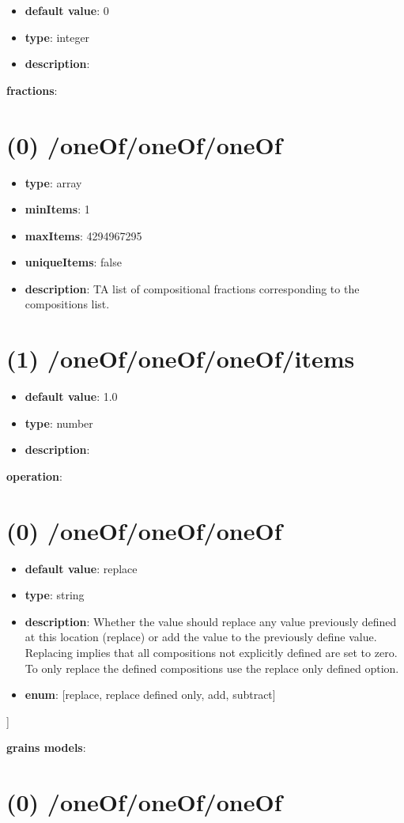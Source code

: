 \begin{itemize}[leftmargin=1em]\item {\bf default value}: 0
\item {\bf type}: integer
\item {\bf description}: 
\end{itemize}\item {\bf fractions}: \section{(0) /oneOf/oneOf/oneOf}
\begin{itemize}[leftmargin=0em]\item {\bf type}: array
\item {\bf minItems}: 1
\item {\bf maxItems}: 4294967295
\item {\bf uniqueItems}: false
\item {\bf description}: TA list of compositional fractions corresponding to the compositions list.
\end{itemize}\section{(1) /oneOf/oneOf/oneOf/items}
\begin{itemize}[leftmargin=1em]\item {\bf default value}: 1.0
\item {\bf type}: number
\item {\bf description}: 
\end{itemize}\item {\bf operation}: \section{(0) /oneOf/oneOf/oneOf}
\begin{itemize}[leftmargin=0em]\item {\bf default value}: replace
\item {\bf type}: string
\item {\bf description}: Whether the value should replace any value previously defined at this location (replace) or add the value to the previously define value. Replacing implies that all compositions not explicitly defined are set to zero. To only replace the defined compositions use the replace only defined option.
\item {\bf enum}: [replace, replace defined only, add, subtract]\end{itemize}]\item {\bf grains models}: \section{(0) /oneOf/oneOf/oneOf}
